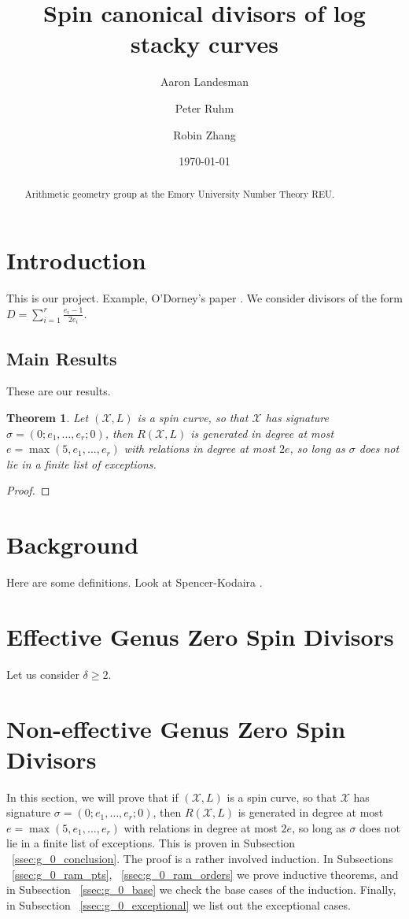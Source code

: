 \documentclass{amsart}
\title{Spin canonical divisors of log stacky curves}
\author{Aaron Landesman}
\author{Peter Ruhm}
\author{Robin Zhang}
\date{\today}
\theoremstyle{plain}
\newtheorem{thm}{Theorem}[section]
\theoremstyle{definition}
\theoremstyle{remark}
\numberwithin{equation}{section}
\newcommand \sx{\mathscr X}
\newcommand \subhalf[1]{\frac{{#1} - 1}{2{#1}}}
\begin{document}
\begin{abstract}
  Arithmetic geometry group at the Emory University Number Theory
	REU.
\end{abstract}

\maketitle

\section{Introduction}
This is our project.
Example, O'Dorney's paper \cite{dorney:canonical}.
We consider divisors of the form $D = \sum_{i = 1}^{r} \subhalf{e_i}$.

\subsection{Main Results}
These are our results.
\begin{thm}
\label{thm:g_0_generators_relations}
Let $(\sx,L)$ is a spin curve, so that $\sx$ has signature $\sigma = (0;e_1,\ldots, e_r;0)$, then $R(\sx,L)$ is generated in degree at most $e = \max(5,e_1,\ldots, e_r)$ with relations in degree at most $2e$, so long as $\sigma$ does not lie in a finite list of exceptions. 
\end{thm}
\begin{proof}

\end{proof}


\section{Background}
Here are some definitions.
Look at Spencer-Kodaira \cite{kodaira:complex-manifolds}.

\section{Effective Genus Zero Spin Divisors}
\label{sec:g_0_effective}
Let us consider $\delta \geq 2$.

\section{Non-effective Genus Zero Spin Divisors}
\label{sec:g_0_non_effective}

In this section, we will prove that if $(\sx,L)$ is a spin curve, so that $\sx$ has signature $\sigma = (0;e_1,\ldots, e_r;0)$, then $R(\sx,L)$ is generated in degree at most $e = \max(5,e_1,\ldots, e_r)$ with relations in degree at most $2e$, so long as $\sigma$ does not lie in a finite list of exceptions. This is proven in Subsection ~\ref{ssec:g_0_conclusion}. The proof is a rather involved induction. In Subsections ~\ref{ssec:g_0_ram_pts}, ~\ref{ssec:g_0_ram_orders} we prove inductive theorems, and in Subsection ~\ref{ssec:g_0_base} we check the base cases of the induction. Finally, in Subsection ~\ref{ssec:g_0_exceptional} we list out the exceptional cases.
\end{document}
